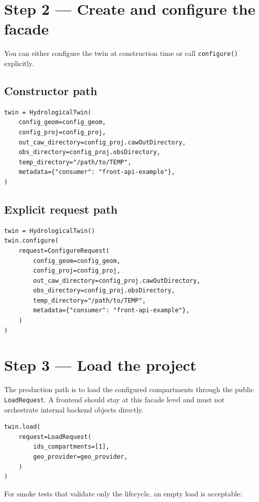\documentclass[11pt]{article}
\begin{document}
\section{Step 2 --- Create and configure the facade}

You can either configure the twin at construction time or call
\texttt{configure()} explicitly.

\subsection*{Constructor path}

\begin{verbatim}
twin = HydrologicalTwin(
    config_geom=config_geom,
    config_proj=config_proj,
    out_caw_directory=config_proj.cawOutDirectory,
    obs_directory=config_proj.obsDirectory,
    temp_directory="/path/to/TEMP",
    metadata={"consumer": "front-api-example"},
)
\end{verbatim}

\subsection*{Explicit request path}

\begin{verbatim}
twin = HydrologicalTwin()
twin.configure(
    request=ConfigureRequest(
        config_geom=config_geom,
        config_proj=config_proj,
        out_caw_directory=config_proj.cawOutDirectory,
        obs_directory=config_proj.obsDirectory,
        temp_directory="/path/to/TEMP",
        metadata={"consumer": "front-api-example"},
    )
)
\end{verbatim}

\section{Step 3 --- Load the project}

The production path is to load the configured compartments through the public
\texttt{LoadRequest}. A frontend should stay at this facade level and must not
orchestrate internal backend objects directly.

\begin{verbatim}
twin.load(
    request=LoadRequest(
        ids_compartments=[1],
        geo_provider=geo_provider,
    )
)
\end{verbatim}

For smoke tests that validate only the lifecycle, an empty load is acceptable:
\end{document}
